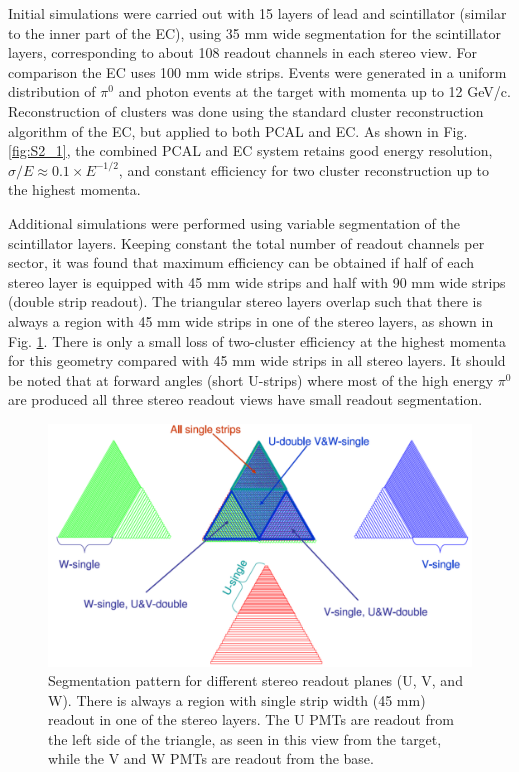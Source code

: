Initial simulations were carried out with 15 layers of lead and scintillator (similar to the inner part of the EC), using 35 mm wide segmentation for the scintillator layers, corresponding to about 108 readout channels in each stereo view. For comparison the EC uses 100 mm wide strips.  Events were generated in a uniform distribution of  $\pi^{0}$ and photon events at the target with momenta up to 12 GeV/c. Reconstruction of clusters was done using the standard cluster reconstruction algorithm of the EC, but applied to both PCAL and EC. As shown in Fig. \ref{fig:S2_1}, the combined PCAL and EC system retains good energy resolution, $\sigma/E \approx 0.1 \times E^{-1/2}$, and constant efficiency for two cluster reconstruction up to the highest momenta.

Additional simulations were performed using variable segmentation of the scintillator layers. Keeping constant the total number of readout channels per sector, it was found that maximum efficiency can be obtained if half of each stereo layer is equipped with 45 mm wide strips and half with 90 mm wide strips (double strip readout). The triangular stereo layers overlap such that there is always a region with 45 mm wide strips in one of the stereo layers, as shown in Fig. \ref{fig:S2_2}. There is only a small loss of two-cluster efficiency at the highest momenta for this geometry compared with 45 mm wide strips in all stereo layers. It should be noted that at forward angles (short U-strips) where most of the high energy $\pi^{0}$ are produced all three stereo readout views have small readout segmentation.

\begin{figure}[hbt]
\centering
\includegraphics[width=0.95\columnwidth,keepaspectratio]{img/S2_2.png}
\caption{Segmentation pattern for different stereo readout planes (U, V, and W). There is always a region with single strip width (45 mm) readout in one of the stereo layers.  The U PMTs are readout from the left side of the triangle, as seen in this view from the target, while the V and W PMTs are readout from the base.}
\label{fig:S2_2}
\end{figure}



